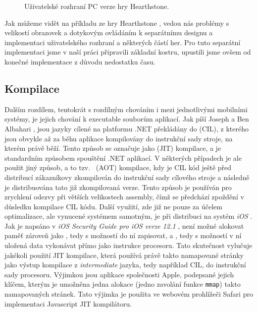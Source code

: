 \begin{figure}[!tbp]
	\centering
	\hfill
	\caption{Uživatelské rozhraní PC verze hry Hearthstone.}
	\label{fig:hearthstone_pc}
\end{figure}

Jak můžeme vidět na příkladu ze hry Hearthstone \citep{site:hearthstone}, vedou nás problémy s velikostí obrazovek a dotykovým ovládáním k separátnímu designu a implementaci uživatelského rozhraní a některých částí her. Pro tuto separátní implementaci jsme v naší práci připravili základní kostru, upustili jsme ovšem od konečné implementace z důvodu nedostatku času.

\subsection{Kompilace}
Dalším rozdílem, tentokrát s rozdílným chováním i mezi jednotlivými mobilními systémy, je jejich chování k executable souborům aplikací. Jak píší Joseph a Ben Albahari \citep[str.~3,4]{book:cs7nutshell}, jsou jazyky cílené na platformu .NET překládány do   (CIL), z kterého jsou obvykle až za běhu aplikace kompilovány do instrukční sady stroje, na kterém právě běží. Tento způsob se označuje jako   (JIT) kompilace, a je standardním způsobem spouštění .NET aplikací. V některých případech je ale použit jiný způsob, a to tzv.~  (AOT) kompilace, kdy je CIL kód ještě před distribucí zákazníkovy zkompilován do instrukční sady cílového stroje a následně je distribuována tato již zkompilovaná verze. Tento způsob je používán pro zrychlení odezvy při větších velikostech assembly, čímž se předchází zpoždění v důsledku kompilace CIL kódu. Další využití, zde již ne pouze za účelem optimalizace, ale vynucené systémem samotným, je při distribuci na systém \emph{iOS} \citep{site:aot}. Jak je napsáno v \textit{iOS Security Guide pro iOS verze 12.1} \citep[str.~27]{book:iossecurityguide}, není možné alokovat paměť zároveň jako \textit{ }, tedy s možností do ní zapisovat, a \textit{ }, tedy s možností v ní uložená data vykonávat přímo jako instrukce procesoru. Tato skutečnost vylučuje jakékoli použití JIT kompilace, která používá právě takto namapované stránky jako výstup kompilace z \textit{intermediate} jazyka, tedy například CIL, do instrukční sady procesoru. Výjimkou jsou aplikace společnosti Apple, podepsané jejich klíčem, kterým je umožněna jedna alokace (jedno zavolání funkce \texttt{mmap}) takto namapovaných stránek. Tato výjimka je použita ve webovém prohlížeči Safari pro implementaci Javascript JIT kompilátoru.  


